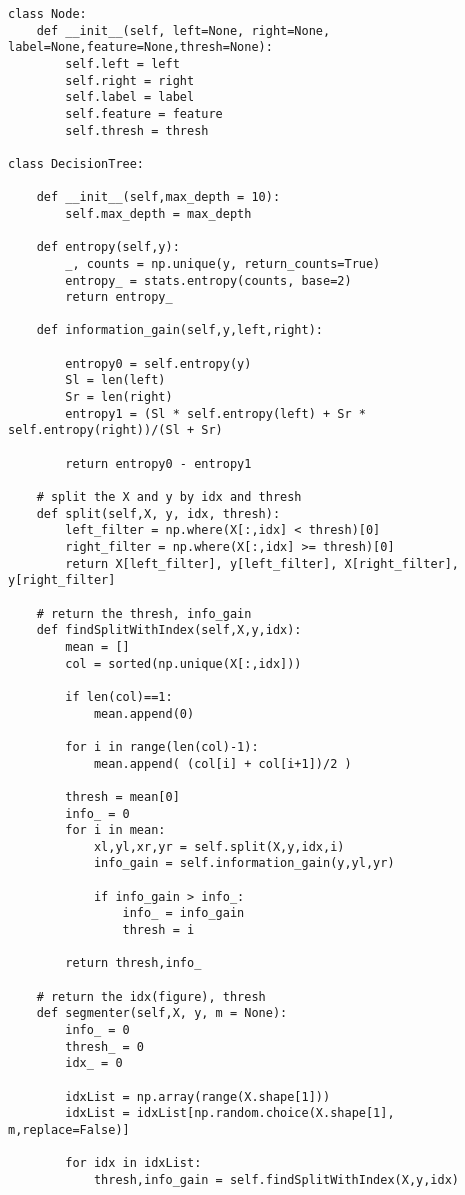 \documentclass[a4paper,12pt]{article}
\begin{document}
\begin{lstlisting}
class Node:
    def __init__(self, left=None, right=None, label=None,feature=None,thresh=None):
        self.left = left
        self.right = right
        self.label = label
        self.feature = feature
        self.thresh = thresh
        
class DecisionTree:

    def __init__(self,max_depth = 10):
        self.max_depth = max_depth
        
    def entropy(self,y):
        _, counts = np.unique(y, return_counts=True)
        entropy_ = stats.entropy(counts, base=2)
        return entropy_

    def information_gain(self,y,left,right):

        entropy0 = self.entropy(y)
        Sl = len(left)
        Sr = len(right)
        entropy1 = (Sl * self.entropy(left) + Sr * self.entropy(right))/(Sl + Sr)

        return entropy0 - entropy1
    
    # split the X and y by idx and thresh
    def split(self,X, y, idx, thresh):
        left_filter = np.where(X[:,idx] < thresh)[0]
        right_filter = np.where(X[:,idx] >= thresh)[0]
        return X[left_filter], y[left_filter], X[right_filter], y[right_filter]
    
    # return the thresh, info_gain
    def findSplitWithIndex(self,X,y,idx):
        mean = []
        col = sorted(np.unique(X[:,idx]))
        
        if len(col)==1:
            mean.append(0)
            
        for i in range(len(col)-1):
            mean.append( (col[i] + col[i+1])/2 )
        
        thresh = mean[0]
        info_ = 0
        for i in mean:
            xl,yl,xr,yr = self.split(X,y,idx,i)
            info_gain = self.information_gain(y,yl,yr)

            if info_gain > info_:
                info_ = info_gain
                thresh = i

        return thresh,info_
        
    # return the idx(figure), thresh 
    def segmenter(self,X, y, m = None):
        info_ = 0
        thresh_ = 0
        idx_ = 0
        
        idxList = np.array(range(X.shape[1]))
        idxList = idxList[np.random.choice(X.shape[1], m,replace=False)]

        for idx in idxList:
            thresh,info_gain = self.findSplitWithIndex(X,y,idx)


\end{lstlisting}
\end{document}

